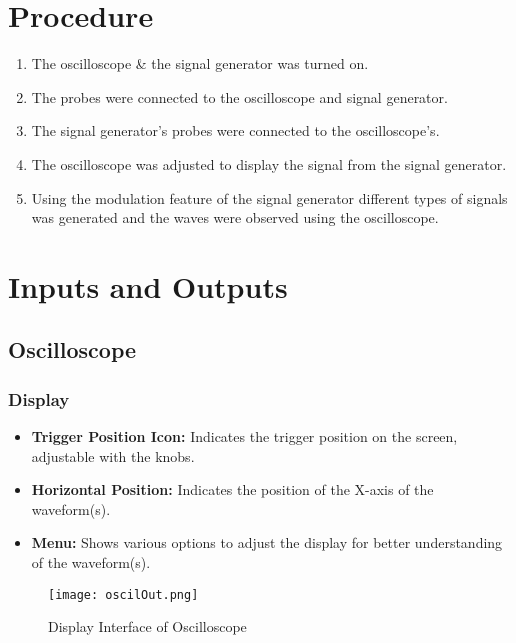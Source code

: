 \documentclass[12pt]{article}
\begin{document}
\section*{Procedure}
\begin{enumerate}
    \item The oscilloscope \& the signal generator was turned on.
    \item The probes were connected to the oscilloscope and signal generator.
    \item The signal generator's probes were connected to the oscilloscope's.
    \item The oscilloscope was adjusted to display the signal from the signal generator.
    \item Using the modulation feature of the signal generator different types of signals was generated and the waves were observed using the oscilloscope.
\end{enumerate}

\section*{Inputs and Outputs}

\subsection*{Oscilloscope}

\subsubsection*{Display}
\begin{itemize}
    \item[] \textbf{Trigger Position Icon:} Indicates the trigger position on the screen, adjustable with the knobs.
    \item[] \textbf{Horizontal Position:} Indicates the position of the X-axis of the waveform(s).
    \item[] \textbf{Menu:} Shows various options to adjust the display for better understanding of the waveform(s).
\end{itemize}

\begin{figure}[H]
    \centering
    \texttt{[image: oscilOut.png]}
    \caption{Display Interface of Oscilloscope}
\end{figure}
\end{document}
